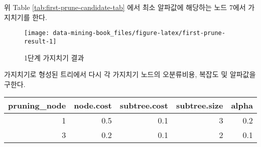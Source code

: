 \documentclass[
]{book}
\newenvironment{Shaded}{\begin{snugshade}}{\end{snugshade}}
\newcommand{\AttributeTok}[1]{\textcolor[rgb]{0.77,0.63,0.00}{#1}}
\newcommand{\FloatTok}[1]{\textcolor[rgb]{0.00,0.00,0.81}{#1}}
\newcommand{\FunctionTok}[1]{\textcolor[rgb]{0.00,0.00,0.00}{#1}}
\newcommand{\NormalTok}[1]{#1}
\newcommand{\OtherTok}[1]{\textcolor[rgb]{0.56,0.35,0.01}{#1}}
\newcommand{\SpecialCharTok}[1]{\textcolor[rgb]{0.00,0.00,0.00}{#1}}
\newcommand{\StringTok}[1]{\textcolor[rgb]{0.31,0.60,0.02}{#1}}
\begin{document}
위 Table \ref{tab:first-prune-candidate-tab} 에서 최소 알파값에 해당하는 노드 7에서 가지치기를 한다.

\begin{Shaded}
\end{Shaded}

\begin{figure}

{\centering \texttt{[image: data-mining-book\_files/figure-latex/first-prune-result-1]} 

}

\caption{1단계 가지치기 결과}\label{fig:first-prune-result}
\end{figure}

가지치기로 형성된 트리에서 다시 각 가지치기 노드의 오분류비용, 복잡도 및 알파값을 구한다.

\begin{Shaded}
\end{Shaded}

\begin{tabular}{r|r|r|r|r}
\hline
pruning\_node & node.cost & subtree.cost & subtree.size & alpha\\
\hline
1 & 0.5 & 0.1 & 3 & 0.2\\
\hline
3 & 0.2 & 0.1 & 2 & 0.1\\
\hline
\end{tabular}
\end{document}
